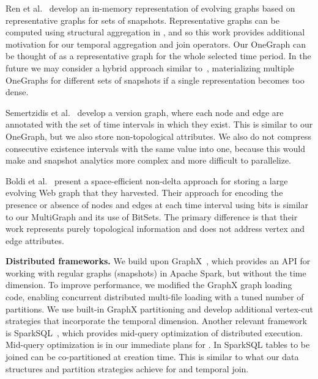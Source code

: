Ren et al.~\cite{Ren2011} develop an in-memory representation of
evolving graphs based on representative graphs for sets of snapshots.
Representative graphs can be computed using structural aggregation in
\ql, and so this work provides additional motivation for our temporal
aggregation and join operators.  Our OneGraph can be thought of as a
representative graph for the whole selected time period.  In the
future we may consider a hybrid approach similar to~\cite{Ren2011},
materializing multiple OneGraphs for different sets of snapshots if a
single representation becomes too dense.

Semertzidis et al.~\cite{Semertzidis2015} develop a version graph,
where each node and edge are annotated with the set of time intervals
in which they exist.  This is similar to our OneGraph, but we also
store non-topological attributes.  We also do not compress consecutive
existence intervals with the same value into one, because this would
make  and snapshot analytics more complex and more
difficult to parallelize.

Boldi et al.~\cite{Boldi2008} present a space-efficient non-delta
approach for storing a large evolving Web graph that they harvested.
Their approach for encoding the presence or absence of nodes and edges
at each time interval using bits is similar to our MultiGraph and its
use of BitSets.  The primary difference is that their work represents
purely topological information and does not address vertex and edge
attributes.

{\bf Distributed frameworks.}  We build upon
GraphX~\cite{DBLP:conf/osdi/GonzalezXDCFS14}, which provides an API
for working with regular graphs (snapshots) in Apache Spark, but
without the time dimension.  To improve performance, we modified the
GraphX graph loading code, enabling concurrent distributed multi-file
loading with a tuned number of partitions.  We use built-in GraphX
partitioning and develop additional vertex-cut strategies that
incorporate the temporal dimension.  Another relevant framework is
SparkSQL~\cite{Xin2013Shark}, which provides mid-query optimization of
distributed execution.  Mid-query optimization is in our immediate
plans for \ql.  In SparkSQL tables to be joined can be co-partitioned
at creation time.  This is similar to what our data structures and
partition strategies achieve for  and temporal join.


